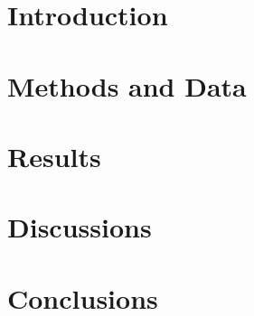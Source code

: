 \documentclass{physics_article_B}
\begin{document}
\section{Introduction}



\section{Methods and Data}

 

\section{Results}



\section{Discussions}



\section{Conclusions}






\end{document}
